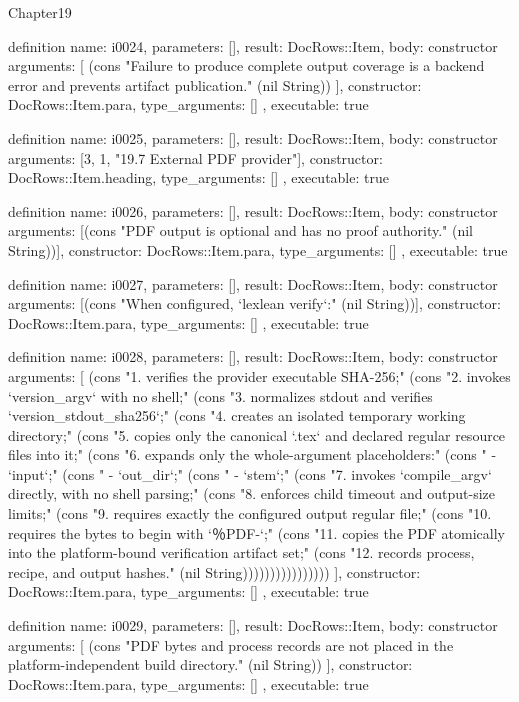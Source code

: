 \begin{lexlean}{Chapter19}
\begin{semanticmodule}
definition{
  name: i0024,
  parameters: [],
  result: DocRows::Item,
  body: constructor{
    arguments: [
      (cons "Failure to produce complete output coverage is a backend error and prevents artifact publication." (nil String))
    ],
    constructor: DocRows::Item.para,
    type_arguments: []
  },
  executable: true
}

definition{
  name: i0025,
  parameters: [],
  result: DocRows::Item,
  body: constructor{
    arguments: [3, 1, "19.7 External PDF provider"],
    constructor: DocRows::Item.heading,
    type_arguments: []
  },
  executable: true
}

definition{
  name: i0026,
  parameters: [],
  result: DocRows::Item,
  body: constructor{
    arguments: [(cons "PDF output is optional and has no proof authority." (nil String))],
    constructor: DocRows::Item.para,
    type_arguments: []
  },
  executable: true
}

definition{
  name: i0027,
  parameters: [],
  result: DocRows::Item,
  body: constructor{
    arguments: [(cons "When configured, `lexlean verify`:" (nil String))],
    constructor: DocRows::Item.para,
    type_arguments: []
  },
  executable: true
}

definition{
  name: i0028,
  parameters: [],
  result: DocRows::Item,
  body: constructor{
    arguments: [
      (cons "1. verifies the provider executable SHA-256;" (cons "2. invokes `version_argv` with no shell;" (cons "3. normalizes stdout and verifies `version_stdout_sha256`;" (cons "4. creates an isolated temporary working directory;" (cons "5. copies only the canonical `.tex` and declared regular resource files into it;" (cons "6. expands only the whole-argument placeholders:" (cons "   - `{input}`;" (cons "   - `{out_dir}`;" (cons "   - `{stem}`;" (cons "7. invokes `compile_argv` directly, with no shell parsing;" (cons "8. enforces child timeout and output-size limits;" (cons "9. requires exactly the configured output regular file;" (cons "10. requires the bytes to begin with `％PDF-`;" (cons "11. copies the PDF atomically into the platform-bound verification artifact set;" (cons "12. records process, recipe, and output hashes." (nil String))))))))))))))))
    ],
    constructor: DocRows::Item.para,
    type_arguments: []
  },
  executable: true
}

definition{
  name: i0029,
  parameters: [],
  result: DocRows::Item,
  body: constructor{
    arguments: [
      (cons "PDF bytes and process records are not placed in the platform-independent build directory." (nil String))
    ],
    constructor: DocRows::Item.para,
    type_arguments: []
  },
  executable: true
}


\end{semanticmodule}
\end{lexlean}
